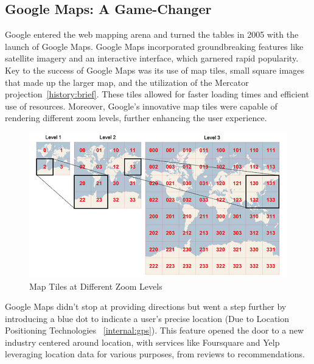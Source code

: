 \documentclass[10pt,oneside,english,a4paper]{article}
\begin{document}
\subsection{Google Maps: A Game-Changer} \label{history:gamechanger}
Google entered the web mapping arena and turned the tables in 2005 with the launch of Google Maps. Google Maps incorporated groundbreaking features like satellite imagery and an interactive interface, which garnered rapid popularity. 
\\Key to the success of Google Maps was its use of map tiles, small square images that made up the larger map, and the utilization of the Mercator projection~\ref{history:brief}. These tiles allowed for faster loading times and efficient use of resources. Moreover, Google's innovative map tiles were capable of rendering different zoom levels, further enhancing the user experience.

\begin{figure}[h]
	\centering
	\includegraphics[scale=0.35]{diagram5.png}
	\caption{Map Tiles at Different Zoom Levels}
	\label{fig:tiles}
\end{figure}

Google Maps didn't stop at providing directions but went a step further by introducing a blue dot to indicate a user's precise location (Due to Location Positioning Technologies ~\ref{internal:gps}). This feature opened the door to a new industry centered around location, with services like Foursquare and Yelp leveraging location data for various purposes, from reviews to recommendations.
\end{document}
